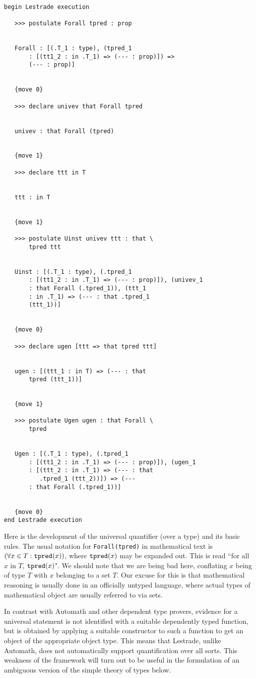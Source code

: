 \documentclass[12pt]{article}
\begin{document}
\begin{verbatim}

begin Lestrade execution

   >>> postulate Forall tpred : prop


   Forall : [(.T_1 : type), (tpred_1 
       : [(tt1_2 : in .T_1) => (--- : prop)]) => 
       (--- : prop)]


   {move 0}

   >>> declare univev that Forall tpred


   univev : that Forall (tpred)


   {move 1}

   >>> declare ttt in T


   ttt : in T


   {move 1}

   >>> postulate Uinst univev ttt : that \
       tpred ttt


   Uinst : [(.T_1 : type), (.tpred_1 
       : [(tt1_2 : in .T_1) => (--- : prop)]), (univev_1 
       : that Forall (.tpred_1)), (ttt_1 
       : in .T_1) => (--- : that .tpred_1 
       (ttt_1))]


   {move 0}

   >>> declare ugen [ttt => that tpred ttt]


   ugen : [(ttt_1 : in T) => (--- : that 
       tpred (ttt_1))]


   {move 1}

   >>> postulate Ugen ugen : that Forall \
       tpred


   Ugen : [(.T_1 : type), (.tpred_1 
       : [(tt1_2 : in .T_1) => (--- : prop)]), (ugen_1 
       : [(ttt_2 : in .T_1) => (--- : that 
          .tpred_1 (ttt_2))]) => (--- 
       : that Forall (.tpred_1))]


   {move 0}
end Lestrade execution
\end{verbatim}

Here is the development of the universal quantifier (over a type) and its basic rules.  The usual notation for {\tt Forall(tpred)} in mathematical text is $(\forall x\in T:{\tt tpred}(x))$, where ${\tt tpred}(x)$ may be expanded out.  This is read ``for all $x$ in $T$, ${\tt tpred}(x)$".  We should note that we are being bad here, conflating $x$ being of type $T$ with $x$ belonging to a set $T$.  Our excuse for this is that mathematical reasoning is usually done in an officially untyped language, where actual types of mathematical object are usually referred to via sets.

In contrast with Automath and other dependent type provers, evidence for a universal statement is not identified with a suitable dependently typed function, but is obtained by applying a suitable constructor to such a function to get an object of the appropriate object type.  This means that Lestrade, unlike Automath, does not automatically support quantification over all sorts.  This weakness of the framework will turn out to be useful in the formulation of an ambiguous version of the simple theory of types below.
\end{document}
